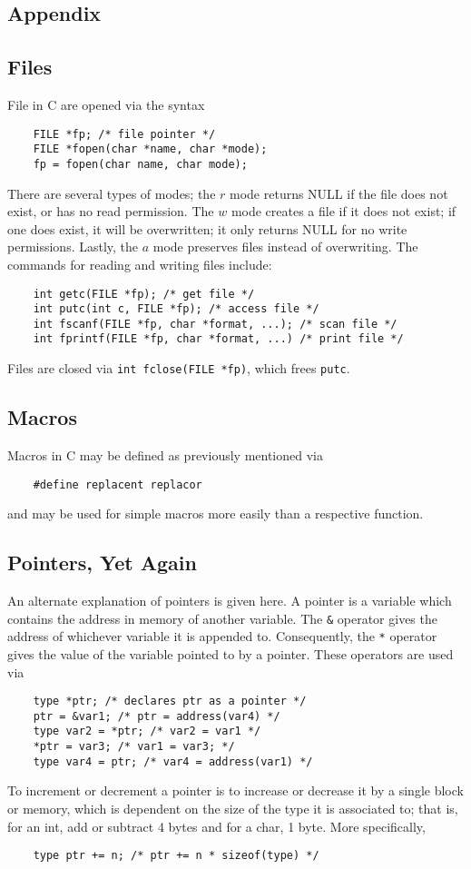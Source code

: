 \documentclass{tufte-book}
\begin{document}
\begin{fullwidth}
\chapter{Appendix}
\section{Files}
File in C are opened via the syntax
\begin{lstlisting}
    FILE *fp; /* file pointer */
    FILE *fopen(char *name, char *mode);
    fp = fopen(char name, char mode);
\end{lstlisting}
There are several types of modes; the $r$ mode returns NULL if the file does not exist, or has no read permission. The $w$ mode creates a file if it does not exist; if one does exist, it will be overwritten; it only returns NULL for no write permissions. Lastly, the $a$ mode preserves files instead of overwriting. The commands for reading and writing files include:
\begin{lstlisting}
    int getc(FILE *fp); /* get file */
    int putc(int c, FILE *fp); /* access file */
    int fscanf(FILE *fp, char *format, ...); /* scan file */
    int fprintf(FILE *fp, char *format, ...) /* print file */
\end{lstlisting}
Files are closed via \lstinline{int fclose(FILE *fp)}, which frees \lstinline{putc}.

\section{Macros}
Macros in C may be defined as previously mentioned via
\begin{lstlisting}
    #define replacent replacor
\end{lstlisting}
and may be used for simple macros more easily than a respective function.

\section{Pointers, Yet Again}
An alternate explanation of pointers is given here. A pointer is a variable which contains the address in memory of another variable. The \lstinline{&} operator gives the address of whichever variable it is appended to. Consequently, the \lstinline{*} operator gives the value of the variable pointed to by a pointer. These operators are used via
\begin{lstlisting}
    type *ptr; /* declares ptr as a pointer */
    ptr = &var1; /* ptr = address(var4) */
    type var2 = *ptr; /* var2 = var1 */
    *ptr = var3; /* var1 = var3; */
    type var4 = ptr; /* var4 = address(var1) */
\end{lstlisting}
To increment or decrement a pointer is to increase or decrease it by a single block or memory, which is dependent on the size of the type it is associated to; that is, for an int, add or subtract 4 bytes and for a char, 1 byte. More specifically,
\begin{lstlisting}
    type ptr += n; /* ptr += n * sizeof(type) */
\end{lstlisting}





\end{fullwidth}
\end{document}
